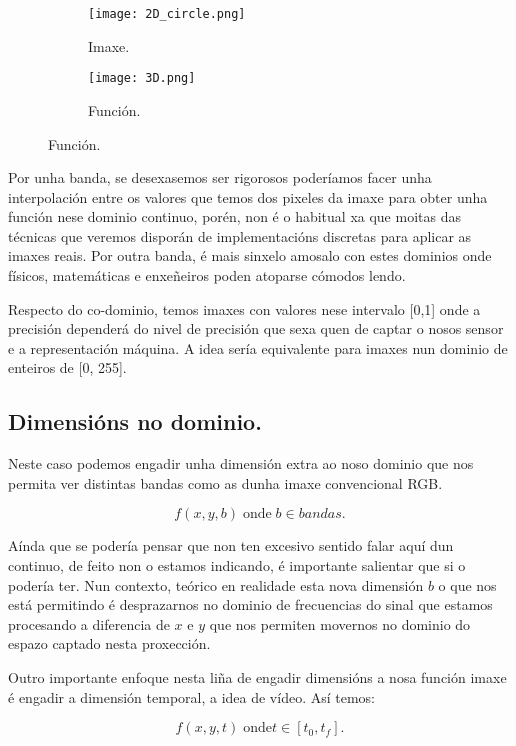 \documentclass{article}
\begin{document}
\begin{figure}
    \begin{subfigure}{0.5\textwidth}
    \texttt{[image: 2D\_circle.png]}
    \caption{Imaxe.}
    \label{fig:enter-label}
    \end{subfigure}
    \begin{subfigure}{0.5\textwidth}
    \texttt{[image: 3D.png]}
    \caption{Función.}
    \end{subfigure}
\end{figure}

Por unha banda, se desexasemos ser rigorosos poderíamos facer unha interpolación entre os valores que temos dos pixeles da imaxe para obter unha función nese dominio continuo, porén, non é o habitual xa que moitas das técnicas que veremos disporán de implementacións discretas para aplicar as imaxes reais. Por outra banda, é mais sinxelo amosalo con estes dominios onde físicos, matemáticas e enxeñeiros poden atoparse cómodos lendo. 

Respecto do co-dominio, temos imaxes con valores nese intervalo [0,1] onde a precisión dependerá do nivel de precisión que sexa quen de captar o nosos sensor e a representación máquina. A idea sería equivalente para imaxes nun dominio de enteiros de [0, 255].

\subsection{Dimensións no dominio.}
Neste caso podemos engadir unha dimensión extra ao noso dominio que nos permita ver distintas bandas como as dunha imaxe convencional RGB. 

\begin{equation}
    f(x, y, b) \; \text{onde} \; b \in {bandas}.
\end{equation}

Aínda que se podería pensar que non ten excesivo sentido falar aquí dun continuo, de feito non o estamos indicando, é importante salientar que si o podería ter. Nun contexto, teórico en realidade esta nova dimensión $b$ o que nos está permitindo é desprazarnos no dominio de frecuencias do sinal que estamos procesando a diferencia de $x$ e $y$ que nos permiten movernos no dominio do espazo captado nesta proxección. 

Outro importante enfoque nesta liña de engadir dimensións a nosa función imaxe é engadir a dimensión temporal, a idea de vídeo. Así temos:

\begin{equation}
    f(x, y, t) \; \text{onde} t \in [t_{0}, t_{f}].
\end{equation}
\end{document}
